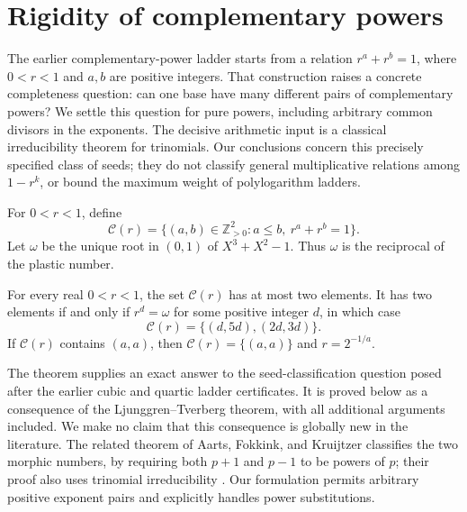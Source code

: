 
\section{Rigidity of complementary powers}
\label{sec:complementary-rigidity}

The earlier complementary-power ladder starts from a relation
$r^a+r^b=1$, where $0<r<1$ and $a,b$ are positive integers.
That construction raises a concrete completeness question: can one base
have many different pairs of complementary powers?  We settle this
question for pure powers, including arbitrary common divisors in the
exponents.  The decisive arithmetic input is a classical irreducibility
theorem for trinomials.  Our conclusions concern this precisely specified
class of seeds; they do not classify general multiplicative relations
among $1-r^k$, or bound the maximum weight of polylogarithm ladders.

For $0<r<1$, define
\[
\mathcal C(r)=\{(a,b)\in\mathbb Z_{>0}^2:
                 a\le b,\ r^a+r^b=1\}.
\]
Let $\omega$ be the unique root in $(0,1)$ of
$X^3+X^2-1$.  Thus $\omega$ is the reciprocal of the plastic number.

\begin{theorem}
\label{thm:complement-collisions}
For every real $0<r<1$, the set $\mathcal C(r)$ has at most two elements.
It has two elements if and only if $r^d=\omega$ for some positive
integer $d$, in which case
\[
\mathcal C(r)=\{(d,5d),(2d,3d)\}.
\]
If $\mathcal C(r)$ contains $(a,a)$, then
$\mathcal C(r)=\{(a,a)\}$ and $r=2^{-1/a}$.
\end{theorem}

The theorem supplies an exact answer to the seed-classification question
posed after the earlier cubic and quartic ladder certificates.  It is
proved below as a consequence of the Ljunggren--Tverberg theorem, with
all additional arguments included.  We make no claim that this
consequence is globally new in the literature.  The related theorem of
Aarts, Fokkink, and Kruijtzer classifies the two morphic numbers, by
requiring both $p+1$ and $p-1$ to be powers of $p$; their proof also uses
trinomial irreducibility \cite{AartsFokkinkKruijtzer2001}.  Our formulation
permits arbitrary positive exponent pairs and explicitly handles power
substitutions.

